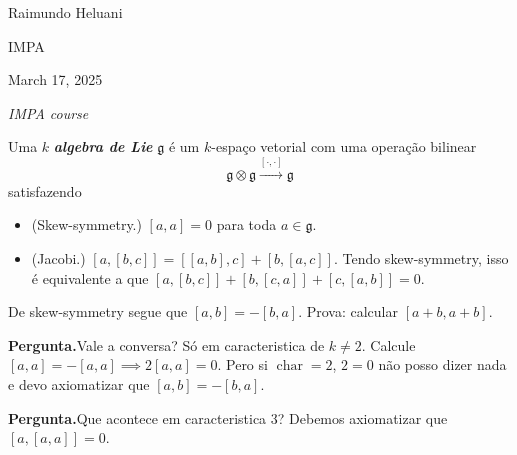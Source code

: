 \hfill{\Large Raimundo Heluani}

{\Large \hfill IMPA}

\hfill{\large March 17, 2025

\hfill \textit{IMPA course}}
\vspace{2em}

\vspace{2em}
\begin{defn}\leavevmode
Uma \(k\) \textit{\textbf{algebra de Lie}} \( \mathfrak{g}\) é um \(k\)-espaço vetorial com uma operação bilinear
\[\mathfrak{g} \otimes \mathfrak{g} \xrightarrow{[\cdot ,\cdot ]}\mathfrak{g}\]
satisfazendo
\begin{itemize}
	\item (Skew-symmetry.) \([a,a]=0\) para toda \(a \in \mathfrak{g}\).
	\item (Jacobi.) \([a,[b,c]]=[[a,b],c]+[b,[a,c]]\). Tendo skew-symmetry, isso  é equivalente a que \([a,[b,c]]+[b,[c,a]]+[c,[a,b]]=0\).
\end{itemize}
\end{defn}

\begin{remark}\leavevmode
	De skew-symmetry segue que \([a,b]=-[b,a]\). Prova: calcular  \([a+b,a+b]\). 

	{\color{4}\bfseries Pergunta.}\hspace{.5em}Vale a conversa? Só em caracteristica de \(k \neq 2\). Calcule \([a,a]=-[a,a]\implies 2[a,a]=0\). Pero si \(\operatorname{char}=2\), \(2=0\) não posso dizer nada e devo axiomatizar que  \([a,b]=-[b,a]\). 

	{\color{4}\bfseries Pergunta.}\hspace{.5em}Que acontece em caracteristica 3? Debemos axiomatizar que \([a,[a,a]]=0\).
\end{remark}


